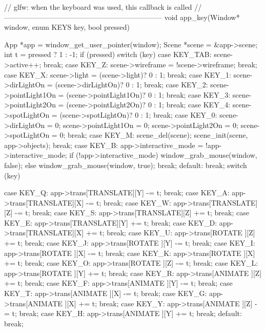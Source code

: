 \documentclass[14pt,a4paper]{extarticle}
\theoremstyle{definition}
\renewcommand{\[}{\begin{singlespace}\begin{equation*}}
\renewcommand{\]}{\end{equation*}\end{singlespace}}
\begin{document}
\begin{multicols}{2}
\begin{ccode}
// glfw: when the keyboard was used, this callback is called
// ------------------------------------------------------------------
void app_key(Window* window, enum KEYS key, bool pressed) {
    App *app = window_get_user_pointer(window);
    Scene *scene = &app->scene;
    int t = pressed ? 1 : -1;
    if (pressed) {
        switch (key) {
        case KEY_TAB:
            scene->active++;
            break;
        case KEY_Z:
            scene->wireframe = !scene->wireframe;
            break;
        case KEY_X:
            scene->light = (scene->light)? 0 : 1;
            break;
        case KEY_1:
            scene->dirLightOn = (scene->dirLightOn)? 0 : 1;
            break;
        case KEY_2:
            scene->pointLight1On = (scene->pointLight1On)? 0 : 1;
            break;
        case KEY_3:
            scene->pointLight2On = (scene->pointLight2On)? 0 : 1;
            break;
        case KEY_4:
            scene->spotLightOn = (scene->spotLightOn)? 0 : 1;
            break;
        case KEY_0:
            scene->dirLightOn = 0;
            scene->pointLight1On = 0;
            scene->pointLight2On = 0;
            scene->spotLightOn = 0;
            break;
        case KEY_M:
            scene_del(scene);
            scene_init(scene, app->objects);
            break;
        case KEY_B:
        {
            app->interactive_mode = !app->interactive_mode;
            if (!app->interactive_mode)
                window_grab_mouse(window, false);
            else
                window_grab_mouse(window, true);
        }
            break;
        default:
            break;
        }
    }
    switch (key) {
    case KEY_Q: app->trans[TRANSLATE][Y] -= t; break;
    case KEY_A: app->trans[TRANSLATE][X] -= t; break;
    case KEY_W: app->trans[TRANSLATE][Z] -= t; break;
    case KEY_S: app->trans[TRANSLATE][Z] += t; break;
    case KEY_E: app->trans[TRANSLATE][Y] += t; break;
    case KEY_D: app->trans[TRANSLATE][X] += t; break;
    case KEY_U: app->trans[ROTATE   ][Z] += t; break;
    case KEY_J: app->trans[ROTATE   ][Y] -= t; break;
    case KEY_I: app->trans[ROTATE   ][X] -= t; break;
    case KEY_K: app->trans[ROTATE   ][X] += t; break;
    case KEY_O: app->trans[ROTATE   ][Z] -= t; break;
    case KEY_L: app->trans[ROTATE   ][Y] += t; break;
    case KEY_R: app->trans[ANIMATE  ][Z] += t; break;
    case KEY_F: app->trans[ANIMATE  ][Y] -= t; break;
    case KEY_T: app->trans[ANIMATE  ][X] -= t; break;
    case KEY_G: app->trans[ANIMATE  ][X] += t; break;
    case KEY_Y: app->trans[ANIMATE  ][Z] -= t; break;
    case KEY_H: app->trans[ANIMATE  ][Y] += t; break;
    default:
        break;

}}
\end{ccode}
\end{multicols}
\end{document}
